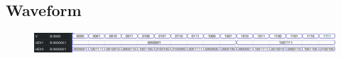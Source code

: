 \documentclass[13pt,a4paper]{report}
\begin{document}
\subsection{Waveform}
\begin{figure}[H]
\centering
\includegraphics[scale=0.55]{images/Exc5_waveform.png}
\end{figure}
\end{document}
